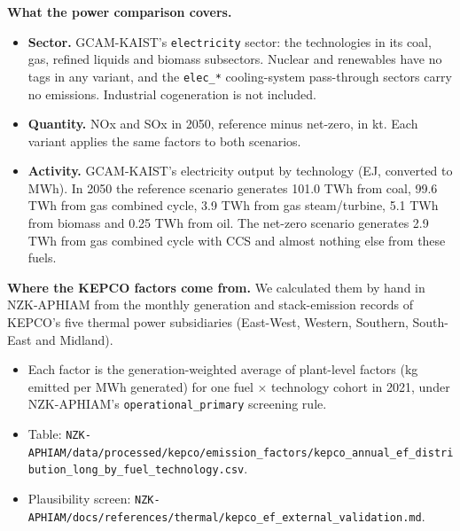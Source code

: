 \textbf{What the power comparison covers.}

\begin{itemize}
\tightlist
\item
  \textbf{Sector.} GCAM-KAIST's \texttt{electricity} sector: the
  technologies in its coal, gas, refined liquids and biomass subsectors.
  Nuclear and renewables have no tags in any variant, and the
  \texttt{elec\_*} cooling-system pass-through sectors carry no emissions.
  Industrial cogeneration is not included.
\item
  \textbf{Quantity.} NOx and SOx in 2050, reference minus net-zero, in kt.
  Each variant applies the same factors to both scenarios.
\item
  \textbf{Activity.} GCAM-KAIST's electricity output by technology (EJ,
  converted to MWh). In 2050 the reference scenario generates 101.0 TWh from
  coal, 99.6 TWh from gas combined cycle, 3.9 TWh from gas steam/turbine,
  5.1 TWh from biomass and 0.25 TWh from oil. The net-zero scenario
  generates 2.9 TWh from gas combined cycle with CCS and almost nothing else
  from these fuels.
\end{itemize}

\textbf{Where the KEPCO factors come from.} We calculated them by hand in
NZK-APHIAM from the monthly generation and stack-emission records of
KEPCO's five thermal power subsidiaries (East-West, Western, Southern,
South-East and Midland).

\begin{itemize}
\tightlist
\item
  Each factor is the generation-weighted average of plant-level factors (kg
  emitted per MWh generated) for one fuel × technology cohort in 2021, under
  NZK-APHIAM's \texttt{operational\_primary} screening rule.
\item
  Table:
  \texttt{NZK-APHIAM/\allowbreak{}data/\allowbreak{}processed/\allowbreak{}kepco/\allowbreak{}emission\_\allowbreak{}factors/\allowbreak{}kepco\_\allowbreak{}annual\_\allowbreak{}ef\_\allowbreak{}distribution\_\allowbreak{}long\_\allowbreak{}by\_\allowbreak{}fuel\_\allowbreak{}technology.\allowbreak{}csv}.
\item
  Plausibility screen:
  \texttt{NZK-APHIAM/\allowbreak{}docs/\allowbreak{}references/\allowbreak{}thermal/\allowbreak{}kepco\_\allowbreak{}ef\_\allowbreak{}external\_\allowbreak{}validation.\allowbreak{}md}.
\end{itemize}

